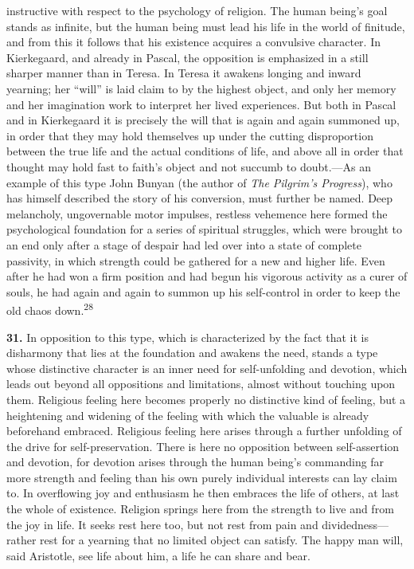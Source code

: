 \documentclass[12pt,a4paper]{book}
\newcommand{\opage}[1]{\marginnote{\footnotesize\textit{[#1]}}}
\begin{document}
instructive with respect to the psychology of religion. The human being's goal
stands as infinite, but the human being must lead his life in the world of
finitude, and from this it follows that his existence acquires a convulsive
character. In Kierkegaard, and already in Pascal, the opposition is emphasized in
a still sharper manner than in Teresa. In Teresa it awakens longing and inward
yearning; her ``will'' is laid claim to by the highest object, and only her
memory and her imagination work to interpret her lived experiences. But both in
Pascal and in Kierkegaard it is precisely the will that is again and again
summoned up, in order that they may hold themselves up under the cutting
disproportion between the true life and the actual conditions of life, and above
all in order that thought may hold fast to faith's object and not succumb to
doubt.---As an example of this type John Bunyan (the author of \emph{The
Pilgrim's Progress}), who has himself described the story of his conversion, must
further be named. Deep melancholy, ungovernable motor impulses, restless
vehemence here formed the psychological foundation for a series of spiritual
struggles, which were brought to an end only after a stage of despair had led
over into a state of complete passivity, in which strength could be gathered for
a new and higher life. Even after he had won a firm position and had begun his
vigorous activity as a curer of souls, he had again and again to summon up his
self-control in order to keep the old chaos down.\textsuperscript{28}

\medskip

\noindent\textbf{31.} In opposition to this type, which is characterized by the
fact that it is disharmony that lies at the foundation and awakens the need,
stands a type whose distinctive character is an inner need for self-unfolding
and devotion, which leads out beyond all oppositions and limitations, almost
without touching upon them. Religious feeling here becomes properly no
distinctive kind of feeling, but a heightening and widening of the feeling with
which the valuable is already beforehand embraced. Religious feeling here arises
through a further unfolding of the drive for self-preservation. There is here no
opposition between self-assertion and devotion, for devotion arises through the
human being's commanding far more strength and feeling than his own purely
individual interests can lay claim to. In overflowing joy and enthusiasm he then
embraces the life of others, at last the whole of existence. Religion springs
here from the strength to live and from the joy in life. It seeks rest here too,
but not rest from pain and dividedness---rather rest for a yearning that no
limited 
\opage{75}object can satisfy. The happy man will, said Aristotle, see life about
him, a life he can share and bear.
\end{document}
